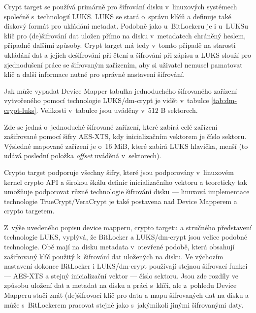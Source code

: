 
Crypt target se používá primárně pro šifrování disku v~linuxových systémech společně s~technologií LUKS. LUKS se stará o~správu klíčů a definuje také diskový formát pro ukládání metadat. Podobně jako u~BitLockeru je i u~LUKSu klíč pro (de)šifrování dat uložen přímo na disku v~metadatech chráněný heslem, případně dalšími způsoby. Crypt target má tedy v~tomto případě na starosti ukládání dat a jejich dešifrování při čtení a šifrování při zápisu a LUKS slouží pro zjednodušení práce se šifrovaným zařízením, aby si uživatel nemusel pamatovat klíč a další informace nutné pro správné nastavení šifrování.\cite{Fruhwirth2005}

Jak může vypadat Device Mapper tabulka jednoduchého šifrovaného zařízení vy\-tvo\-ře\-né\-ho pomocí technologie LUKS/dm-crypt je vidět v~tabulce \ref{tab:dm-crypt-luks}. Velikosti v~tabulce jsou uváděny v~512 B sektorech.


Zde se jedná o~jednoduché šifrované zařízení, které zabírá celé zařízení zašifrované pomocí šifry AES-XTS, kdy inicializačním vektorem je číslo sektoru. Výsledné mapované zařízení je o~16 MiB, které zabírá LUKS hlavička, menší (to udává poslední položka \emph{offset} uváděná v~sektorech).

Crypto target podporuje všechny šifry, které jsou podporovány v~linuxovém kernel crypto API a širokou škálu definic inicializačního vektoru a teoreticky tak umožňuje podporovat různé technologie šifrování disku --- linuxová implementace technologie TrueCrypt/VeraCrypt je také postavena nad Device Mapperem a crypto targetem\cite{Broz2014}.


Z~výše uvedeného popisu device mapperu, crypto targetu a stručného představení technologie LUKS, vyplývá, že BitLocker a LUKS/dm-crypt jsou velice podobné technologie. Obě mají na disku metadata v~otevřené podobě, která obsahují zašifrovaný klíč použitý k~šifrování dat uložených na disku. Ve výchozím nastavení dokonce BitLocker i LUKS/dm-crypt používají stejnou šifrovací funkci --- AES-XTS a stejný inicializační vektor --- číslo sektoru. Jsou zde rozdíly ve způsobu uložení dat a metadat na disku a práci s~klíči, ale z~pohledu Device Mapperu stačí znát (de)šifrovací klíč pro data a mapu šifrovaných dat na disku a může s~BitLockerem pracovat stejně jako s~jakýmikoli jinými šifrovanými daty.


